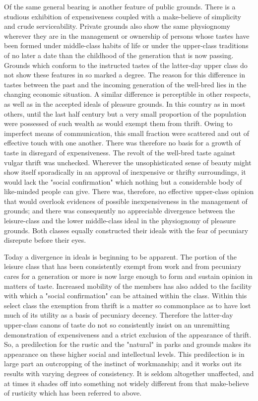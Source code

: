 \documentclass[12pt]{report}
\begin{document}
Of the same general bearing is another feature of public grounds. There
is a studious exhibition of expensiveness coupled with a make-believe of
simplicity and crude serviceability. Private grounds also show the same
physiognomy wherever they are in the management or ownership of persons
whose tastes have been formed under middle-class habits of life or under
the upper-class traditions of no later a date than the childhood of the
generation that is now passing. Grounds which conform to the instructed
tastes of the latter-day upper class do not show these features in so
marked a degree. The reason for this difference in tastes between the
past and the incoming generation of the well-bred lies in the changing
economic situation. A similar difference is perceptible in other
respects, as well as in the accepted ideals of pleasure grounds. In this
country as in most others, until the last half century but a very small
proportion of the population were possessed of such wealth as would
exempt them from thrift. Owing to imperfect means of communication,
this small fraction were scattered and out of effective touch with one
another. There was therefore no basis for a growth of taste in disregard
of expensiveness. The revolt of the well-bred taste against vulgar
thrift was unchecked. Wherever the unsophisticated sense of beauty
might show itself sporadically in an approval of inexpensive or thrifty
surroundings, it would lack the "social confirmation" which nothing
but a considerable body of like-minded people can give. There was,
therefore, no effective upper-class opinion that would overlook
evidences of possible inexpensiveness in the management of grounds;
and there was consequently no appreciable divergence between the
leisure-class and the lower middle-class ideal in the physiognomy of
pleasure grounds. Both classes equally constructed their ideals with the
fear of pecuniary disrepute before their eyes.

Today a divergence in ideals is beginning to be apparent. The portion of
the leisure class that has been consistently exempt from work and from
pecuniary cares for a generation or more is now large enough to form and
sustain opinion in matters of taste. Increased mobility of the members
has also added to the facility with which a "social confirmation" can be
attained within the class. Within this select class the exemption from
thrift is a matter so commonplace as to have lost much of its utility
as a basis of pecuniary decency. Therefore the latter-day upper-class
canons of taste do not so consistently insist on an unremitting
demonstration of expensiveness and a strict exclusion of the appearance
of thrift. So, a predilection for the rustic and the "natural" in parks
and grounds makes its appearance on these higher social and intellectual
levels. This predilection is in large part an outcropping of the
instinct of workmanship; and it works out its results with varying
degrees of consistency. It is seldom altogether unaffected, and at times
it shades off into something not widely different from that make-believe
of rusticity which has been referred to above.
\end{document}

